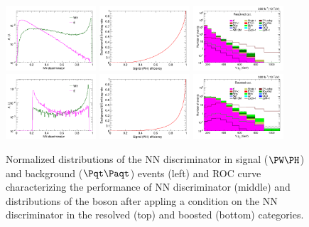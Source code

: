 \documentclass[a4paper,11pt]{article}
\newcommand{\Pt}{{{\Pqt}}\xspace}
\newcommand{\PAt}{{{{\Paqt}}}\xspace}
\begin{document}
\begin{figure}[hbtp]
\begin{center}
\includegraphics[width=0.3\textwidth]{Figures/New/RECO/Plot_WH_MVA_WH_fast_resolved.png}
\includegraphics[width=0.3\textwidth]{Figures/New/RECO/ROC_plot_TT_MVA_resolved.png}
\includegraphics[width=0.3\textwidth]{Figures/New/RECO/Plot_Resolved_SR_V_pt_sigpurity.png}
\includegraphics[width=0.3\textwidth]{Figures/New/RECO/Plot_WH_MVA_WH_fast_boosted.png}
\includegraphics[width=0.3\textwidth]{Figures/New/RECO/ROC_plot_TT_MVA_boosted.png}
\includegraphics[width=0.3\textwidth]{Figures/New/RECO/Plot_Boosted_SR_V_pt_sigpurity.png}
\end{center}
\caption{
Normalized distributions of the NN discriminator in signal ($\PW\PH$) and background ($\Pt\PAt$) events (left) and ROC curve characterizing the performance of NN discriminator (middle) and  distributions of the \PW boson \pt after appling a condition on the NN discriminator in the resolved (top) and boosted (bottom) categories.
}
\label{fig:MVA}
\end{figure}
\end{document}

